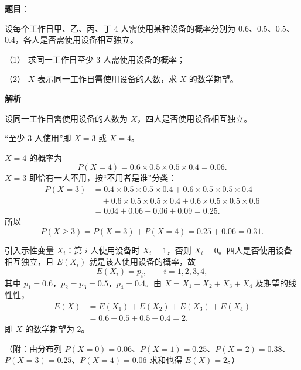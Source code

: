 \begin{answer}

\textbf{题目}：

设每个工作日甲、乙、丙、丁 4 人需使用某种设备的概率分别为 $0.6$、$0.5$、$0.5$、$0.4$，各人是否需使用设备相互独立。

（1） 求同一工作日至少 3 人需使用设备的概率；

（2） $X$ 表示同一工作日需使用设备的人数，求 $X$ 的数学期望。

\textbf{解析}

设同一工作日需使用设备的人数为 $X$，四人是否使用设备相互独立。


“至少 3 人使用”即 $X=3$ 或 $X=4$。

$X=4$ 的概率为
\nopagebreak[4]
\[P(X=4)=0.6\times0.5\times0.5\times0.4=0.06.\]
$X=3$ 即恰有一人不用，按“不用者是谁”分类：
\nopagebreak[4]
\[\begin{aligned}
P(X=3)&=0.4\times0.5\times0.5\times0.4
+0.6\times0.5\times0.5\times0.4\\
&\quad+0.6\times0.5\times0.5\times0.4
+0.6\times0.5\times0.5\times0.6\\
&=0.04+0.06+0.06+0.09=0.25.
\end{aligned}\]
所以
\nopagebreak[4]
\[P(X\geqslant3)=P(X=3)+P(X=4)=0.25+0.06=0.31.\]


引入示性变量 $X_i$：第 $i$ 人使用设备时 $X_i=1$，否则 $X_i=0$。四人是否使用设备相互独立，且 $E(X_i)$ 就是该人使用设备的概率，故
\nopagebreak[4]
\[E(X_i)=p_i,\qquad i=1,2,3,4,\]
其中 $p_1=0.6$，$p_2=p_3=0.5$，$p_4=0.4$。由 $X=X_1+X_2+X_3+X_4$ 及期望的线性性，
\nopagebreak[4]
\[\begin{aligned}
E(X)&=E(X_1)+E(X_2)+E(X_3)+E(X_4)\\
&=0.6+0.5+0.5+0.4=2.
\end{aligned}\]
即 $X$ 的数学期望为 $2$。

（附：由分布列 $P(X=0)=0.06$、$P(X=1)=0.25$、$P(X=2)=0.38$、$P(X=3)=0.25$、$P(X=4)=0.06$ 求和也得 $E(X)=2$。）



\end{answer}

